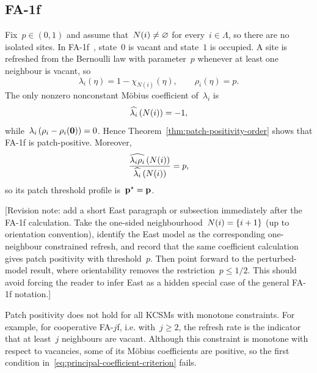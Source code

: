 \subsection{FA-1f}
\label{subsec:fa-1f-applications}

Fix~$p\in(0,1)$ and assume that~$N(i)\neq\varnothing$ for every~$i\in\Lambda$, so there are no isolated sites.
In FA-1f~\cite{FredricksonAndersen1984,CancriniEtAl2008,HartarskyToninelli2025},
state~$0$ is vacant and state~$1$ is occupied. A site is refreshed from the
Bernoulli law with parameter~$p$ whenever at least one neighbour is vacant, so
\begin{equation*}
\lambda_i(\eta)=1-\chi_{N(i)}(\eta),
\qquad
\rho_i(\eta)=p.
\end{equation*}
The only nonzero nonconstant M\"obius coefficient of~$\lambda_i$ is
\begin{equation*}
\widehat{\lambda_i}\left(N(i)\right)=-1,
\end{equation*}
while~$\lambda_i\left(\rho_i-\rho_i(\mathbf{0})\right)=0$. Hence
Theorem~\ref{thm:patch-positivity-order} shows that FA-1f is patch-positive.
Moreover,
\begin{equation*}
\frac{\widehat{\lambda_i\rho_i}\left(N(i)\right)}
{\widehat{\lambda_i}\left(N(i)\right)}=p,
\end{equation*}
so its patch threshold profile is~$\mathbf{p}^\star=\mathbf{p}$.

\textcolor{revisionpurple}{[Revision note: add a short East paragraph or
subsection immediately after the FA-1f calculation. Take the one-sided
neighbourhood~$N(i)=\left\{i+1\right\}$ (up to orientation convention), identify the East
model as the corresponding one-neighbour constrained refresh, and record that
the same coefficient calculation gives patch positivity with threshold~$p$.
Then point forward to the perturbed-model result, where orientability removes
the restriction~$p\leq1/2$. This should avoid forcing the reader to infer East
as a hidden special case of the general FA-1f notation.]}

\begin{remark}
Patch positivity does not hold for all KCSMs with monotone constraints. For
example, for cooperative FA-$j$f, i.e. with~$j\geq2$, the refresh rate is the indicator that at
least~$j$ neighbours are vacant. Although this constraint is monotone with
respect to vacancies, some of its M\"obius coefficients are positive, so the
first condition in~\eqref{eq:principal-coefficient-criterion} fails.
\end{remark}

